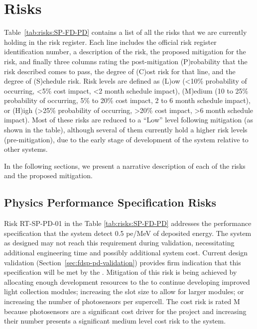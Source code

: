 \section{Risks}
\label{sec:fdsp-pd-risks}

Table~\ref{tab:risks:SP-FD-PD} contains a list of all the
risks that we are currently holding in the  risk register.  Each line includes the official  risk register identification number, a description of the risk, the proposed mitigation for the risk, and finally three columns rating the post-mitigation (P)robability that the risk described comes to pass, the degree of (C)ost risk for that line, and the degree of (S)chedule risk.  Risk levels are defined as (L)ow (<10\% probability of occurring, <5\% cost impact, <2 month schedule impact), (M)edium (10 to 25\% probability of occurring, 5\% to 20\% cost impact, 2 to 6 month schedule impact), or (H)igh (>25\% probability of occurring, >20\% cost impact, >6 month schedule impact).  Most of these risks are reduced to a ``Low'' level following mitigation (as shown in the table), although several of them currently hold a higher risk levels (pre-mitigation), due to the early stage of development of the  system relative to other systems.  

In the following sections, we present a narrative description of each of the risks and the proposed mitigation.




\subsection{Physics Performance Specification Risks}
\label{sec:pds-risks-text}

Risk RT-SP-PD-01 in the Table \ref{tab:risks:SP-FD-PD} addresses the performance specification that the  system detect 0.5 pe/MeV of deposited energy.  The system as designed may not reach this requirement during validation, necessitating additional engineering time and possibly additional system cost.  Current design validation (Section~\ref{sec:fdsp-pd-validation}) 
provides firm indication that this specification will be met by the .  Mitigation of this risk is being achieved by allocating enough development resources to the  to continue developing improved light collection modules; increasing the   slot size to allow for larger modules; or increasing the number of photosensors per  supercell.  
The cost risk is rated M because photosensors are a significant cost driver for the project and increasing their number presents a significant medium level cost risk to the system.

